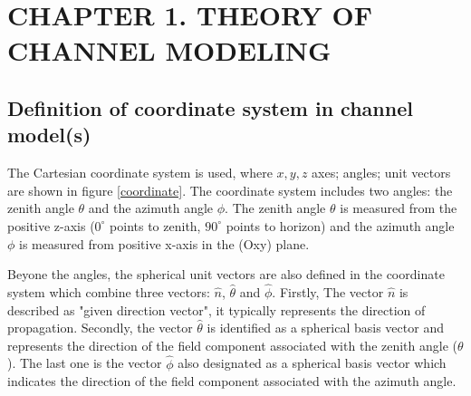\documentclass{article} %
\begin{document}

%




\tableofcontents 
\thispagestyle{empty}
\cleardoublepage



{\let\oldnumberline\numberline
\renewcommand{\numberline}{Figure~\oldnumberline}
\listoffigures} 
\newpage




\section*{CHAPTER 1. THEORY OF CHANNEL MODELING}
\setcounter{section}{1}
\setcounter{figure}{0}
\setcounter{table}{0}
\subsection{Definition of coordinate system in channel model(s)}
The Cartesian coordinate system is used, where $x, y, z$ axes; angles; unit vectors are shown in figure \ref{coordinate}. The coordinate system includes two angles: the zenith angle $\theta$ and the azimuth angle $\phi$. The zenith angle $\theta$ is measured from the positive z-axis ($0^\circ$ points to zenith, $90^\circ$ points to horizon) and the azimuth angle $\phi$ is measured from positive x-axis in the (Oxy) plane.

Beyone the angles, the spherical unit vectors are also defined in the coordinate system which combine three vectors: $\hat{n}$, $\hat{\theta}$ and $\hat{\phi}$. Firstly, The vector $\hat{n}$ is described as "given direction vector", it typically represents the direction of propagation. Secondly, the vector $\hat{\theta}$ is identified as a spherical basis vector and represents the direction of the field component associated with the zenith angle ($\theta$). The last one is the vector $\hat{\phi}$ also designated as a spherical basis vector which indicates the direction of the field component associated with the azimuth angle.
\end{document}
